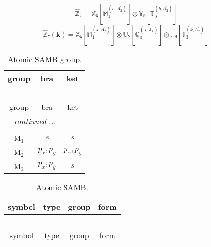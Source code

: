 \documentclass[fleqn,10pt,landscape]{article}
\begin{document}
\begin{itemize}
\begin{dmath*}
\hat{\mathbb{Z}}_{7}=\mathbb{X}_{5}[\mathbb{M}_{1}^{(a,A_{2}^{\prime})}] \otimes\mathbb{Y}_{9}[\mathbb{T}_{3}^{(b,A_{2}^{\prime})}]
\end{dmath*}
\begin{dmath*}
\hat{\mathbb{Z}}_{7}(\bm{k})=\mathbb{X}_{5}[\mathbb{M}_{1}^{(a,A_{2}^{\prime})}] \otimes\mathbb{U}_{2}[\mathbb{Q}_{0}^{(s,A_{1}^{\prime})}] \otimes\mathbb{F}_{9}[\mathbb{T}_{3}^{(k,A_{2}^{\prime})}]
\end{dmath*}
\begin{center}
\renewcommand{\arraystretch}{1.3}
\begin{longtable}{c|c|c}
\caption{Atomic SAMB group.}
 \\
 \hline \hline
group & bra & ket \\ \hline \endfirsthead

\multicolumn{2}{l}{\tablename\ \thetable{}} \\
 \hline \hline
group & bra & ket \\ \hline \endhead

 \hline \hline
\multicolumn{2}{r}{\footnotesize\it continued ...} \\ \endfoot

 \hline \hline
\multicolumn{2}{r}{} \\ \endlastfoot

M$_{1}$ & $s$ & $s$ \\
M$_{2}$ & $p_{x}, p_{y}$ & $p_{x}, p_{y}$ \\
M$_{3}$ & $p_{x}, p_{y}$ & $s$ \\
\end{longtable}
\end{center}
\begin{center}
\renewcommand{\arraystretch}{1.3}
\begin{longtable}{c|c|c|c}
\caption{Atomic SAMB.}
 \\
 \hline \hline
symbol & type & group & form \\ \hline \endfirsthead

\multicolumn{3}{l}{\tablename\ \thetable{}} \\
 \hline \hline
symbol & type & group & form \\ \hline \endhead


\end{longtable}
\end{center}
\end{itemize}
\end{document}
